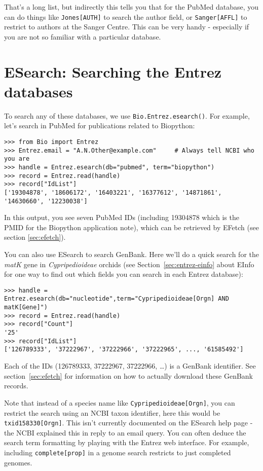 \documentclass{report}
\begin{document}
That's a long list, but indirectly this tells you that for the PubMed
database, you can do things like \texttt{Jones[AUTH]} to search the
author field, or \texttt{Sanger[AFFL]} to restrict to authors at the
Sanger Centre. This can be very handy - especially if you are not so
familiar with a particular database.

\section{ESearch: Searching the Entrez databases}
\label{sec:entrez-esearch}
To search any of these databases, we use \verb+Bio.Entrez.esearch()+. For example, let's search in PubMed for publications related to Biopython:
\begin{verbatim}
>>> from Bio import Entrez
>>> Entrez.email = "A.N.Other@example.com"     # Always tell NCBI who you are
>>> handle = Entrez.esearch(db="pubmed", term="biopython")
>>> record = Entrez.read(handle)
>>> record["IdList"]
['19304878', '18606172', '16403221', '16377612', '14871861', '14630660', '12230038']
\end{verbatim}
In this output, you see seven PubMed IDs (including 19304878 which is the PMID for the Biopython application note), which can be retrieved by EFetch (see section \ref{sec:efetch}).

You can also use ESearch to search GenBank. Here we'll do a quick
search for the \emph{matK} gene in \emph{Cypripedioideae} orchids
(see Section~\ref{sec:entrez-einfo} about EInfo for one way to
find out which fields you can search in each Entrez database):

\begin{verbatim}
>>> handle = Entrez.esearch(db="nucleotide",term="Cypripedioideae[Orgn] AND matK[Gene]")
>>> record = Entrez.read(handle)
>>> record["Count"]
'25'
>>> record["IdList"]
['126789333', '37222967', '37222966', '37222965', ..., '61585492']
\end{verbatim}

\noindent Each of the IDs (126789333, 37222967, 37222966, \ldots) is a GenBank identifier.
See section~\ref{sec:efetch} for information on how to actually download these GenBank records.

Note that instead of a species name like \texttt{Cypripedioideae[Orgn]}, you can restrict the search using an NCBI taxon identifier, here this would be \texttt{txid158330[Orgn]}.  This isn't currently documented on the ESearch help page - the NCBI explained this in reply to an email query.  You can often deduce the search term formatting by playing with the Entrez web interface.  For example, including \texttt{complete[prop]} in a genome search restricts to just completed genomes.
\end{document}

